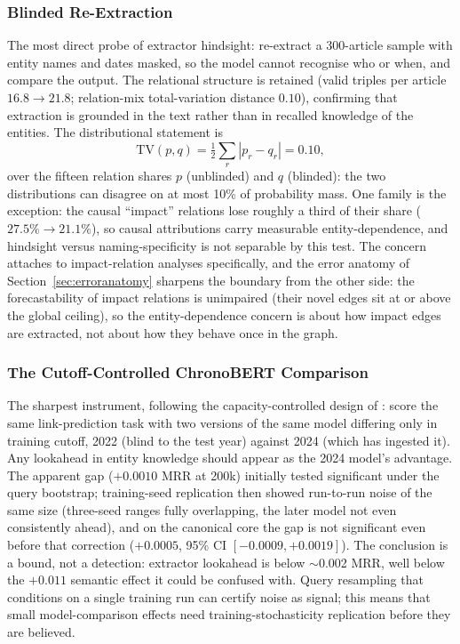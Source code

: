 \documentclass[a4paper,12pt]{report}
\begin{document}
\subsubsection{Blinded Re-Extraction}
The most direct probe of extractor hindsight: re-extract a 300-article
sample with entity names and dates masked, so the model cannot recognise
who or when, and compare the output. The relational structure is retained
(valid triples per article $16.8 \rightarrow 21.8$; relation-mix
total-variation distance $0.10$), confirming that extraction is grounded in
the text rather than in recalled knowledge of the entities. The
distributional statement is
\begin{equation}
\mathrm{TV}(p, q) = \tfrac{1}{2} \sum_{r} | p_r - q_r | = 0.10,
\label{eq:tv}
\end{equation}
over the fifteen relation shares $p$ (unblinded) and $q$ (blinded): the
two distributions can disagree on at most 10\% of probability mass. One family is
the exception: the causal ``impact'' relations lose roughly a third of
their share ($27.5\% \rightarrow 21.1\%$), so causal attributions carry
measurable entity-dependence, and hindsight versus naming-specificity is
not separable by this test. The concern attaches to impact-relation analyses
specifically, and the error anatomy of Section~\ref{sec:erroranatomy}
sharpens the boundary from the other side: the forecastability of impact
relations is unimpaired (their novel edges sit at or above the global
ceiling), so the entity-dependence concern is about how impact edges are
extracted, not about how they behave once in the graph.

\subsubsection{The Cutoff-Controlled ChronoBERT Comparison}
The sharpest instrument, following the capacity-controlled design of
\citet{He2025Chrono}: score the same link-prediction task with two versions
of the same model differing only in training cutoff, 2022 (blind to the
test year) against 2024 (which has ingested it). Any lookahead in entity
knowledge should appear as the 2024 model's advantage. The apparent gap
($+0.0010$ MRR at 200k) initially tested significant under the query
bootstrap; training-seed replication then showed run-to-run noise of the
same size (three-seed ranges fully overlapping, the later model not even
consistently ahead), and on the canonical core the gap is not significant
even before that correction ($+0.0005$, 95\% CI $[-0.0009, +0.0019]$). The
conclusion is a bound, not a detection: extractor lookahead is below
$\sim$0.002 MRR, well below the $+0.011$ semantic effect it could be
confused with. Query resampling that conditions on a single training run
can certify noise as signal; this means that small model-comparison effects need
training-stochasticity replication before they are believed.
\end{document}
